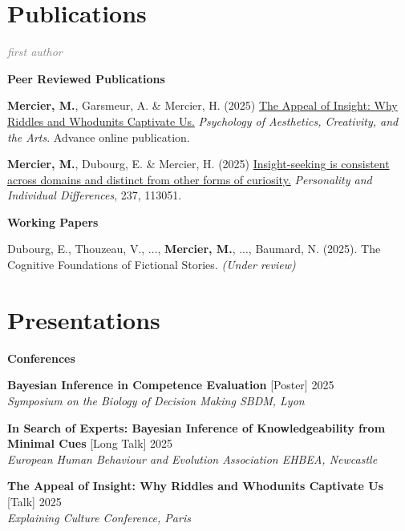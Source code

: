 \documentclass[letterpaper,11pt]{article}
\newcommand{\resumeItem}[1]{
  \item\small{
    {#1 \vspace{-2pt}}
  }
}
\newcommand{\resumeItemWithYear}[3][ ]{ %
  \item\small{
    #2 \hfill {\small #3} \\
    #1
  }
}
\newcommand{\resumePublicationHeading}[1]{
  \vspace{5pt} %
  \noindent\textbf{\small #1} %
  \vspace{2pt} %
}
\begin{document}
\section{Publications}


\small

\noindent\textcolor{gray}{\textit{\footnotemark[1]first author}}
\vspace{5pt} %

\resumePublicationHeading{Peer Reviewed Publications}
\begin{etaremune}
    \resumeItem{\textbf{Mercier, M.\footnotemark[1]}, Garsmeur, A. \& Mercier, H. (2025) \href{https://doi.org/10.1037/aca0000773}{The Appeal of Insight: Why Riddles and Whodunits Captivate Us.} \emph{Psychology of Aesthetics, Creativity, and the Arts}. Advance online publication.}
    \resumeItem{\textbf{Mercier, M.\footnotemark[1]}, Dubourg, E. \& Mercier, H. (2025) \href{https://doi.org/10.1016/j.paid.2025.113051}{Insight-seeking is consistent across domains and distinct from other forms of curiosity.} \emph{Personality and Individual Differences}, 237, 113051.}
\end{etaremune}


\resumePublicationHeading{Working Papers}
\begin{etaremune}
    \resumeItem{Dubourg, E., Thouzeau, V., ..., \textbf{Mercier, M.}, ..., Baumard, N. (2025). The Cognitive Foundations of Fictional Stories. \emph{(Under review)}
    }

\end{etaremune}


\section{Presentations}

\resumePublicationHeading{Conferences}
\begin{etaremune}
  \resumeItemWithYear{\textbf{Bayesian Inference in Competence Evaluation} [Poster]}{2025}{\textit{Symposium on the Biology of Decision Making SBDM, Lyon}}
  \resumeItemWithYear{\textbf{In Search of Experts: Bayesian Inference of Knowledgeability from Minimal Cues} [Long Talk]}{2025}{\textit{European Human Behaviour and Evolution Association EHBEA, Newcastle}}
  \resumeItemWithYear{\textbf{The Appeal of Insight: Why Riddles and Whodunits Captivate Us} [Talk]}{2025}{\textit{Explaining Culture Conference, Paris}}
\end{etaremune}
\end{document}
